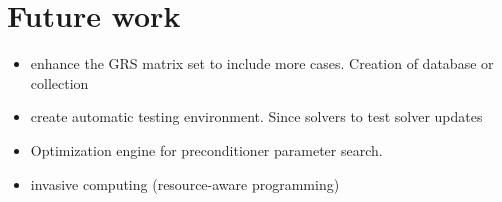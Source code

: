 \section{Future work}
\label{subseq:part-2-future-work}

\begin{itemize}

	\item enhance the GRS matrix set to include more cases. Creation of database or collection
	
	\item create automatic testing environment. Since solvers to test solver updates

	\item Optimization engine for preconditioner parameter search.

	
	\item invasive computing (resource-aware programming)
		
	
\end{itemize}


